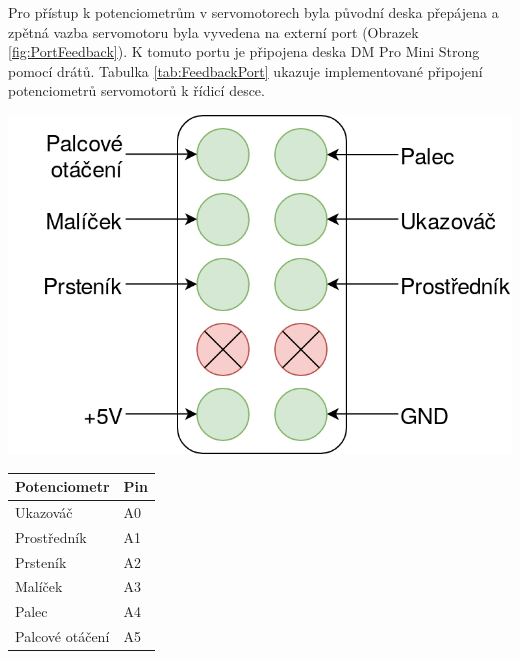 \documentclass[thesis=B,czech]{FITthesis}[2012/06/26]
\begin{document}
Pro přístup k potenciometrům v servomotorech byla původní deska přepájena a zpětná vazba servomotoru byla vyvedena na externí port (Obrazek \ref{fig:PortFeedback}). K tomuto portu je připojena deska DM Pro Mini Strong pomocí drátů. Tabulka \ref{tab:FeedbackPort} ukazuje implementované připojení potenciometrů servomotorů k řídicí desce.

\hspace{3cm}

\begin{minipage}{\textwidth}
  \begin{minipage}[b]{0.29\textwidth}
    \centering
    \includegraphics[scale=0.2]{./image/PortFeedback.png}
    \label{fig:PortFeedback}
  \end{minipage}
  \hfill
  \begin{minipage}[b]{0.8\textwidth}
    \centering
\begin{tabular}{|l|l|}
\hline
\textbf{Potenciometr} & \textbf{Pin} \\ \hline
Ukazováč        & A0  \\ \hline
Prostředník     & A1  \\ \hline
Prsteník        & A2  \\ \hline
Malíček         & A3  \\ \hline
Palec           & A4  \\ \hline
Palcové otáčení & A5  \\ \hline
\end{tabular}
      \label{tab:FeedbackPort}
    \end{minipage}
  \end{minipage}
\end{document}
